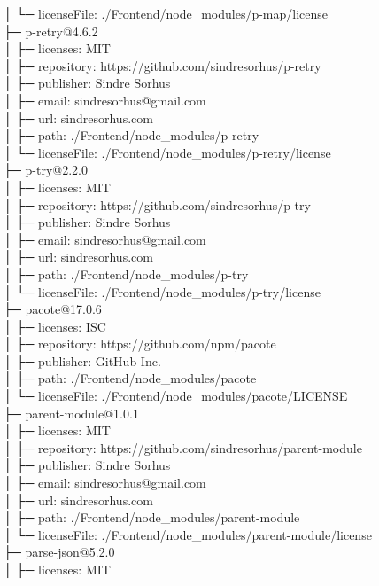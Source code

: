 │  └─ licenseFile: ./Frontend/node\_modules/p-map/license\\
├─ p-retry@4.6.2\\
│  ├─ licenses: MIT\\
│  ├─ repository: https://github.com/sindresorhus/p-retry\\
│  ├─ publisher: Sindre Sorhus\\
│  ├─ email: sindresorhus@gmail.com\\
│  ├─ url: sindresorhus.com\\
│  ├─ path: ./Frontend/node\_modules/p-retry\\
│  └─ licenseFile: ./Frontend/node\_modules/p-retry/license\\
├─ p-try@2.2.0\\
│  ├─ licenses: MIT\\
│  ├─ repository: https://github.com/sindresorhus/p-try\\
│  ├─ publisher: Sindre Sorhus\\
│  ├─ email: sindresorhus@gmail.com\\
│  ├─ url: sindresorhus.com\\
│  ├─ path: ./Frontend/node\_modules/p-try\\
│  └─ licenseFile: ./Frontend/node\_modules/p-try/license\\
├─ pacote@17.0.6\\
│  ├─ licenses: ISC\\
│  ├─ repository: https://github.com/npm/pacote\\
│  ├─ publisher: GitHub Inc.\\
│  ├─ path: ./Frontend/node\_modules/pacote\\
│  └─ licenseFile: ./Frontend/node\_modules/pacote/LICENSE\\
├─ parent-module@1.0.1\\
│  ├─ licenses: MIT\\
│  ├─ repository: https://github.com/sindresorhus/parent-module\\
│  ├─ publisher: Sindre Sorhus\\
│  ├─ email: sindresorhus@gmail.com\\
│  ├─ url: sindresorhus.com\\
│  ├─ path: ./Frontend/node\_modules/parent-module\\
│  └─ licenseFile: ./Frontend/node\_modules/parent-module/license\\
├─ parse-json@5.2.0\\
│  ├─ licenses: MIT\\
